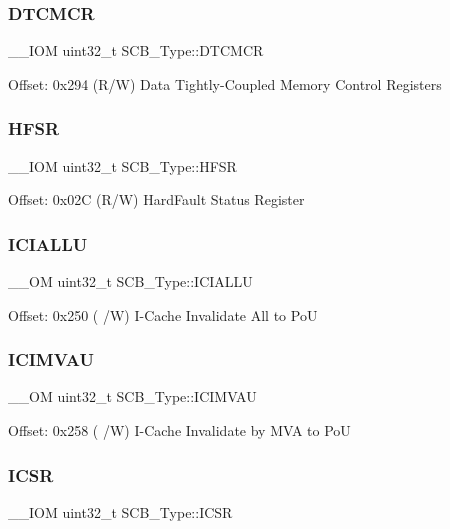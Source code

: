 \subsubsection{\texorpdfstring{DTCMCR}{DTCMCR}}
{\footnotesize\ttfamily \+\_\+\+\_\+\+I\+OM uint32\+\_\+t S\+C\+B\+\_\+\+Type\+::\+D\+T\+C\+M\+CR}

Offset\+: 0x294 (R/W) Data Tightly-\/\+Coupled Memory Control Registers \mbox{\label{structSCB__Type_a14ad254659362b9752c69afe3fd80934}} 
\subsubsection{\texorpdfstring{HFSR}{HFSR}}
{\footnotesize\ttfamily \+\_\+\+\_\+\+I\+OM uint32\+\_\+t S\+C\+B\+\_\+\+Type\+::\+H\+F\+SR}

Offset\+: 0x02C (R/W) Hard\+Fault Status Register \mbox{\label{structSCB__Type_a573260e7836dbc43707df97dd475a0c8}} 
\subsubsection{\texorpdfstring{ICIALLU}{ICIALLU}}
{\footnotesize\ttfamily \+\_\+\+\_\+\+OM uint32\+\_\+t S\+C\+B\+\_\+\+Type\+::\+I\+C\+I\+A\+L\+LU}

Offset\+: 0x250 ( /W) I-\/\+Cache Invalidate All to PoU \mbox{\label{structSCB__Type_a5eca5a3e5aedd89a9655df8f5798e2b0}} 
\subsubsection{\texorpdfstring{ICIMVAU}{ICIMVAU}}
{\footnotesize\ttfamily \+\_\+\+\_\+\+OM uint32\+\_\+t S\+C\+B\+\_\+\+Type\+::\+I\+C\+I\+M\+V\+AU}

Offset\+: 0x258 ( /W) I-\/\+Cache Invalidate by M\+VA to PoU \mbox{\label{structSCB__Type_a0ca18ef984d132c6bf4d9b61cd00f05a}} 
\subsubsection{\texorpdfstring{ICSR}{ICSR}}
{\footnotesize\ttfamily \+\_\+\+\_\+\+I\+OM uint32\+\_\+t S\+C\+B\+\_\+\+Type\+::\+I\+C\+SR}

